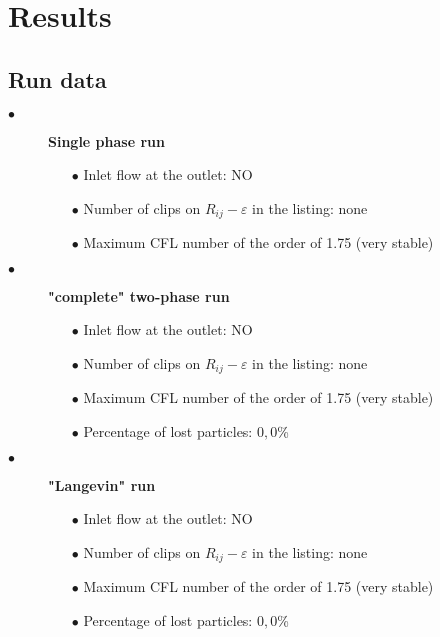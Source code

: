 \section{Results}

\subsection{Run data}

\begin{description}

   \item[$\bullet$]\textbf{Single phase run}

         \begin{itemize}
            \item[$\bullet$] Inlet flow at the outlet: NO
            \item[$\bullet$] Number of clips on $R_{ij}-\varepsilon$ in the listing: none
            \item[$\bullet$] Maximum CFL number of the order of 1.75 (very stable)
         \end{itemize}

   \item[$\bullet$]\textbf{"complete" two-phase run}

         \begin{itemize}
            \item[$\bullet$] Inlet flow at the outlet: NO
            \item[$\bullet$] Number of clips on $R_{ij}-\varepsilon$ in the listing: none
            \item[$\bullet$] Maximum CFL number of the order of 1.75 (very stable)
            \item[$\bullet$] Percentage of lost particles: $0,0$\%
         \end{itemize}
         
   \item[$\bullet$]\textbf{"Langevin" run}

         \begin{itemize}
            \item[$\bullet$] Inlet flow at the outlet: NO
            \item[$\bullet$] Number of clips on $R_{ij}-\varepsilon$ in the listing: none
            \item[$\bullet$] Maximum CFL number of the order of 1.75 (very stable)
            \item[$\bullet$] Percentage of lost particles: $0,0$\%
         \end{itemize}


\end{description}
